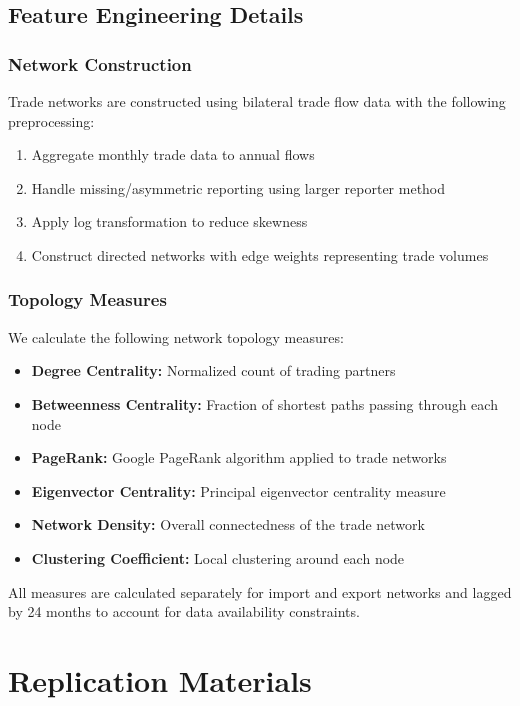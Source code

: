 \documentclass[11pt,a4paper]{article}
\begin{document}
\subsection{Feature Engineering Details}

\subsubsection{Network Construction}

Trade networks are constructed using bilateral trade flow data with the following preprocessing:

\begin{enumerate}
\item Aggregate monthly trade data to annual flows
\item Handle missing/asymmetric reporting using larger reporter method
\item Apply log transformation to reduce skewness
\item Construct directed networks with edge weights representing trade volumes
\end{enumerate}

\subsubsection{Topology Measures}

We calculate the following network topology measures:

\begin{itemize}
\item \textbf{Degree Centrality:} Normalized count of trading partners
\item \textbf{Betweenness Centrality:} Fraction of shortest paths passing through each node
\item \textbf{PageRank:} Google PageRank algorithm applied to trade networks
\item \textbf{Eigenvector Centrality:} Principal eigenvector centrality measure
\item \textbf{Network Density:} Overall connectedness of the trade network
\item \textbf{Clustering Coefficient:} Local clustering around each node
\end{itemize}

All measures are calculated separately for import and export networks and lagged by 24 months to account for data availability constraints.

\section{Replication Materials}
\end{document}
